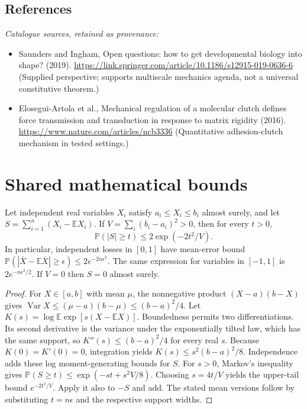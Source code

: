 \documentclass[11pt]{article}
\begin{document}
\subsection{References}
\noindent\emph{Catalogue sources, retained as provenance:}
\begin{itemize}
\item Saunders and Ingham, Open questions: how to get developmental biology into shape? (2019). \url{https://link.springer.com/article/10.1186/s12915-019-0636-6} (Supplied perspective; supports multiscale mechanics agenda, not a universal constitutive theorem.)
\item Elosegui-Artola et al., Mechanical regulation of a molecular clutch defines force transmission and transduction in response to matrix rigidity (2016). \url{https://www.nature.com/articles/ncb3336} (Quantitative adhesion-clutch mechanism in tested settings.)
\end{itemize}




\section{Shared mathematical bounds}\label{app:bounds}
\begin{lemma}\label{lem:bounded}
Let independent real variables $X_i$ satisfy $a_i\leq X_i\leq b_i$ almost surely,
and let $S=\sum_{i=1}^n(X_i-\mathbb{E} X_i)$. If
$V=\sum_i(b_i-a_i)^2>0$, then for every $t>0$,
\[
 \mathbb{P}(|S|\geq t)\leq 2\exp(-2t^2/V).
\]
In particular, independent losses in $[0,1]$ have mean-error bound
$\mathbb{P}(|\overline X-\mathbb{E}\overline X|\geq\epsilon)
\leq2e^{-2n\epsilon^2}$. The same expression for variables in $[-1,1]$
is $2e^{-n\epsilon^2/2}$. If $V=0$ then $S=0$ almost surely.
\end{lemma}
\begin{proof}
For $X\in[a,b]$ with mean $\mu$, the nonnegative product
$(X-a)(b-X)$ gives
$\operatorname{Var} X\leq(\mu-a)(b-\mu)\leq(b-a)^2/4$.
Let $K(s)=\log\mathbb{E}\exp[s(X-\mathbb{E} X)]$.
Boundedness permits two differentiations. Its second derivative is the variance
under the exponentially tilted law, which has the same support, so
$K''(s)\leq(b-a)^2/4$ for every real $s$.
Because $K(0)=K'(0)=0$, integration yields
$K(s)\leq s^2(b-a)^2/8$.
Independence adds these log moment-generating bounds for $S$.
For $s>0$, Markov's inequality gives
$\mathbb{P}(S\geq t)\leq\exp(-st+s^2V/8)$.
Choosing $s=4t/V$ yields the upper-tail bound $e^{-2t^2/V}$.
Apply it also to $-S$ and add. The stated mean versions follow by substituting
$t=n\epsilon$ and the respective support widths.
\end{proof}
\end{document}
